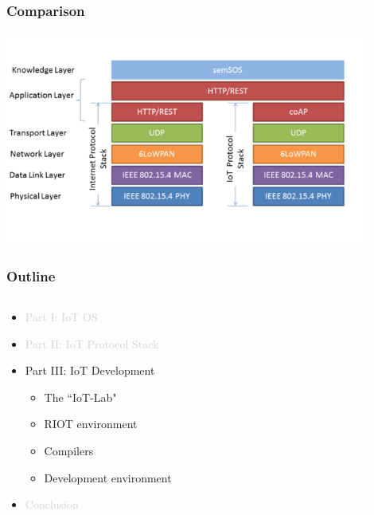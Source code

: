 \documentclass{beamer}
\begin{document}
\begin{frame}
	\frametitle{Comparison}
	\vspace{.5cm}
	\hspace*{.5cm} \includegraphics[width=12cm]{figs/Web-and-IoT-Stacks-2.png}
\end{frame}
\begin{frame}
	\frametitle{Outline}
	\begin{columns}[c]
		\begin{column}{30cm}
			\vspace{.1cm}
			\begin{itemize}
				\justifying
				\item \textcolor{LightGray}{Part I: IoT OS}
				\item \textcolor{LightGray}{Part II: IoT Protocol Stack}
				\item Part III: IoT Development
				\begin{itemize}
					\item The ``IoT-Lab" 
					\item RIOT environment
					\item Compilers
					\item Development environment
				\end{itemize}
				\item \textcolor{LightGray}{Conclusion}
			\end{itemize}
		\end{column}
	\end{columns}
\end{frame}
\end{document}
